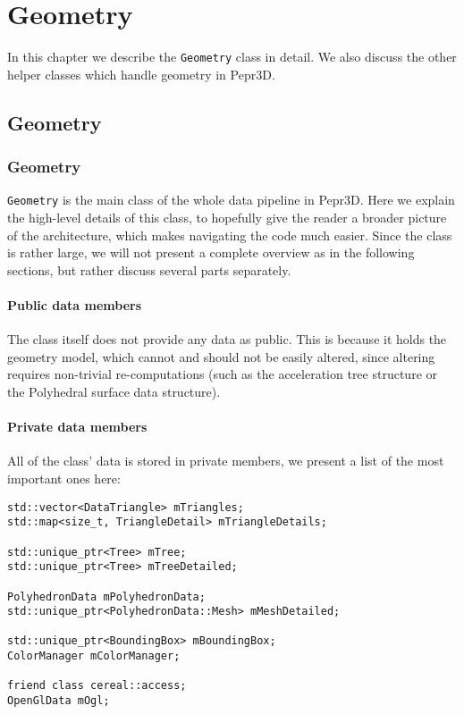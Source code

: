 \chapter{Geometry}

In this chapter we describe the \texttt{Geometry} class in detail. We also discuss the other helper classes which handle geometry in Pepr3D.

\label{chap:geom}

\section{Geometry}

\subsection{Geometry}

\texttt{Geometry} is the main class of the whole data pipeline in Pepr3D. Here we explain the high-level details of this class, to hopefully give the reader a broader picture of the architecture, which makes navigating the code much easier. Since the class is rather large, we will not present a complete overview as in the following sections, but rather discuss several parts separately.

\subsubsection{Public data members}

The class itself does not provide any data as public. This is because it holds the geometry model, which cannot and should not be easily altered, since altering requires non-trivial re-computations (such as the acceleration tree structure or the Polyhedral surface data structure).

\subsubsection{Private data members}

All of the class' data is stored in private members, we present a list of the most important ones here:

\begin{lstlisting}
std::vector<DataTriangle> mTriangles;
std::map<size_t, TriangleDetail> mTriangleDetails;

std::unique_ptr<Tree> mTree;
std::unique_ptr<Tree> mTreeDetailed;

PolyhedronData mPolyhedronData;
std::unique_ptr<PolyhedronData::Mesh> mMeshDetailed;

std::unique_ptr<BoundingBox> mBoundingBox;
ColorManager mColorManager;

friend class cereal::access;
OpenGlData mOgl;
\end{lstlisting}

